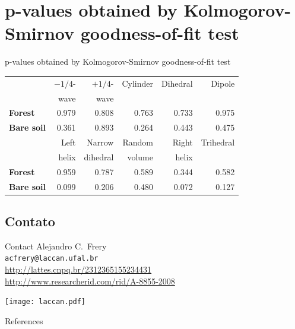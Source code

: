 \documentclass[10pt]{beamer}
\begin{document}
\section[Goodness-of-fit test]{p-values obtained by Kolmogorov-Smirnov goodness-of-fit test}

\begin{frame}{p-values obtained by Kolmogorov-Smirnov goodness-of-fit test}
    \begin{table}[hbt]
    \centering
    \begin{tabular}{lrrrrr}
    \toprule
    & $-1/4$- & $+1/4$- & Cylinder & Dihedral & Dipole\\
    & wave & wave & & &\\
    \cmidrule(lr){2-6}
    \textbf{Forest} & 0.979 & 0.808 & 0.763 & 0.733 & 0.975\\
    \textbf{Bare soil} & 0.361 & 0.893 & 0.264 & 0.443 & 0.475\\
    \midrule
    & Left & Narrow & Random & Right & Trihedral\\
    & helix & dihedral & volume & helix & \\
    \cmidrule(lr){2-6}
    \textbf{Forest} & 0.959 & 0.787 & 0.589 & 0.344 & 0.582\\
    \textbf{Bare soil} & 0.099 & 0.206 & 0.480 & 0.072 & 0.127\\
    \bottomrule
    \end{tabular} 
    \end{table}
\end{frame}

\subsection{Contato}
\begin{frame}
	\begin{alertblock}{Contact}
		Alejandro C.\ Frery\\
		\texttt{acfrery@laccan.ufal.br}\\
		\url{http://lattes.cnpq.br/2312365155234431}\\
		\url{http://www.researcherid.com/rid/A-8855-2008}\\
	\end{alertblock}
	\centering
	\texttt{[image: laccan.pdf]}\\
\end{frame}	

\begin{frame}[allowframebreaks]{References}
\nocite{ANovelRadarVegetationIndexforCompactPolarimetricSARData2019,ClassificationPolSARGeodesic,AScatteringPowerFactorizationFrameworkUsingaGeodesicdistanceinRadarPolarimetry2018,AScatteringPowerFactorizationFrameworkUsingaGeodesicDistanceforMultilookedPolSARData2019,NovelTechniquesforBuiltupAreaExtractionfromPolarimetricSARImages2019,AGeneralizedVolumeScatteringModelBasedVegetationIndexfromPolarimetricSARData2019}
  
  

\end{frame}
\end{document}
